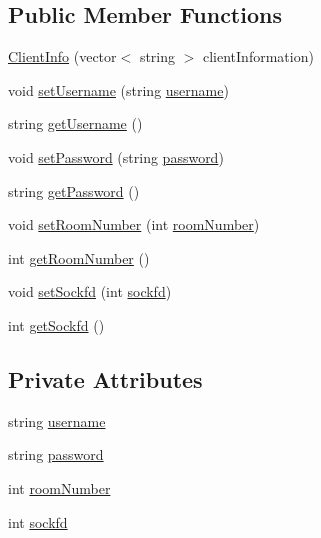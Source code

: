 \subsection*{Public Member Functions}
\begin{DoxyCompactItemize}
\item 
\hyperlink{class_client_info_ac0c713eb6ebbab4dc690621fa300b6bb}{Client\+Info} (vector$<$ string $>$ client\+Information)
\item 
void \hyperlink{class_client_info_a0e1fccf03cefb8bfe74cc8a3a3ef255e}{set\+Username} (string \hyperlink{class_client_info_abb5d48a0c38e02d8ae706be2cfd63877}{username})
\item 
string \hyperlink{class_client_info_a8e1748f9727f05de37606cdd906d6558}{get\+Username} ()
\item 
void \hyperlink{class_client_info_a5096e8c7946d4256d7c8523292858577}{set\+Password} (string \hyperlink{class_client_info_aef295b0c02aed068c75eef7d24b0739d}{password})
\item 
string \hyperlink{class_client_info_a710aaf777b1cf2dde1507ecf521a44a8}{get\+Password} ()
\item 
void \hyperlink{class_client_info_a699860324454ebd9cc0b59c36484f5a1}{set\+Room\+Number} (int \hyperlink{class_client_info_a7058c5f8b9c7295eb02e79f64ceb8919}{room\+Number})
\item 
int \hyperlink{class_client_info_a9ae9d4b036b61419126519bdcacd0edc}{get\+Room\+Number} ()
\item 
void \hyperlink{class_client_info_aa82745ad2790f5a3d4ecd3a6432ad377}{set\+Sockfd} (int \hyperlink{class_client_info_a45f3edd658463cb224352e237104790e}{sockfd})
\item 
int \hyperlink{class_client_info_ab0308d4b24054f68b158b1c5cc514734}{get\+Sockfd} ()
\end{DoxyCompactItemize}
\subsection*{Private Attributes}
\begin{DoxyCompactItemize}
\item 
string \hyperlink{class_client_info_abb5d48a0c38e02d8ae706be2cfd63877}{username}
\item 
string \hyperlink{class_client_info_aef295b0c02aed068c75eef7d24b0739d}{password}
\item 
int \hyperlink{class_client_info_a7058c5f8b9c7295eb02e79f64ceb8919}{room\+Number}
\item 
int \hyperlink{class_client_info_a45f3edd658463cb224352e237104790e}{sockfd}
\end{DoxyCompactItemize}


